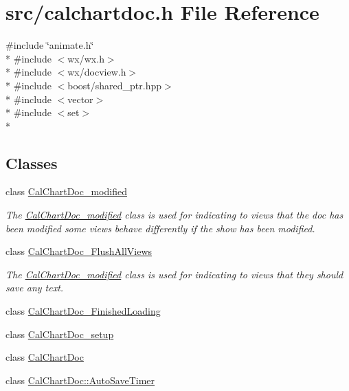 \hypertarget{a00181}{\section{src/calchartdoc.h File Reference}
\label{a00181}
}
{\ttfamily \#include \char`\"{}animate.\-h\char`\"{}}\\*
{\ttfamily \#include $<$wx/wx.\-h$>$}\\*
{\ttfamily \#include $<$wx/docview.\-h$>$}\\*
{\ttfamily \#include $<$boost/shared\-\_\-ptr.\-hpp$>$}\\*
{\ttfamily \#include $<$vector$>$}\\*
{\ttfamily \#include $<$set$>$}\\*
\subsection*{Classes}
\begin{DoxyCompactItemize}
\item 
class \hyperlink{a00023}{Cal\-Chart\-Doc\-\_\-modified}
\begin{DoxyCompactList}\small\item\em The \hyperlink{a00023}{Cal\-Chart\-Doc\-\_\-modified} class is used for indicating to views that the doc has been modified some views behave differently if the show has been modified. \end{DoxyCompactList}\item 
class \hyperlink{a00022}{Cal\-Chart\-Doc\-\_\-\-Flush\-All\-Views}
\begin{DoxyCompactList}\small\item\em The \hyperlink{a00023}{Cal\-Chart\-Doc\-\_\-modified} class is used for indicating to views that they should save any text. \end{DoxyCompactList}\item 
class \hyperlink{a00021}{Cal\-Chart\-Doc\-\_\-\-Finished\-Loading}
\item 
class \hyperlink{a00024}{Cal\-Chart\-Doc\-\_\-setup}
\item 
class \hyperlink{a00020}{Cal\-Chart\-Doc}
\item 
class \hyperlink{a00016}{Cal\-Chart\-Doc\-::\-Auto\-Save\-Timer}
\end{DoxyCompactItemize}
